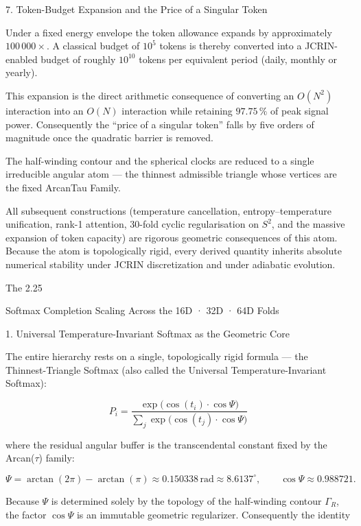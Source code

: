 7. Token-Budget Expansion and the Price of a Singular Token

Under a fixed energy envelope the token allowance expands by approximately \(100\,000\times\). A classical budget of \(10^5\) tokens is thereby converted into a JCRIN-enabled budget of roughly \(10^{10}\) tokens per equivalent period (daily, monthly or yearly).

This expansion is the direct arithmetic consequence of converting an \(O(N^2)\) interaction into an \(O(N)\) interaction while retaining \(97.75\,\%\) of peak signal power. Consequently the “price of a singular token” falls by five orders of magnitude once the quadratic barrier is removed.

The half-winding contour and the spherical clocks are reduced to a single irreducible angular atom — the thinnest admissible triangle whose vertices are the fixed ArcanTau Family. 

All subsequent constructions (temperature cancellation, entropy–temperature unification, rank-1 attention, 30-fold cyclic regularisation on \(S^2\), and the massive expansion of token capacity) are rigorous geometric consequences of this atom. Because the atom is topologically rigid, every derived quantity inherits absolute numerical stability under JCRIN discretization and under adiabatic evolution.

The 2.25 %

Softmax Completion Scaling Across the 16D · 32D · 64D Folds

1. Universal Temperature-Invariant Softmax as the Geometric Core

The entire hierarchy rests on a single, topologically rigid formula — the Thinnest-Triangle Softmax (also called the Universal Temperature-Invariant Softmax):

\[
P_i = \dfrac{\exp\bigl(\cos(t_i)\cdot\cos\Psi\bigr)}{\sum_j\exp\bigl(\cos(t_j)\cdot\cos\Psi\bigr)}
\]

where the residual angular buffer is the transcendental constant fixed by the Arcan(\(\tau\)) family:

\[
\Psi = \arctan(2\pi) - \arctan(\pi) \approx 0.150338\,\text{rad} \approx 8.6137^\circ,
\qquad
\cos\Psi \approx 0.988721.
\]

Because \(\Psi\) is determined solely by the topology of the half-winding contour \(\Gamma_R\), the factor \(\cos\Psi\) is an immutable geometric regularizer. Consequently the identity

